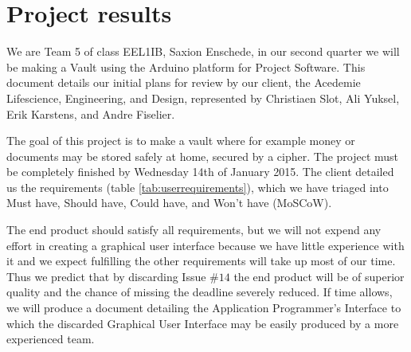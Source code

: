 \chapter{Project results}
We are Team 5 of class EEL1IB, Saxion Enschede, in our second quarter we will be making a Vault using the Arduino platform for Project Software. This document details our initial plans for review by our client, the Acedemie Lifescience, Engineering, and Design, represented by Christiaen Slot, Ali Yuksel, Erik Karstens, and Andre Fiselier.

The goal of this project is to make a vault where for example money or documents may be stored safely at home, secured by a cipher. The project must be completely finished by Wednesday 14th of January 2015. The client detailed us the requirements (table \ref{tab:userrequirements}), which we have triaged into Must have, Should have, Could have, and Won't have (MoSCoW).

The end product should satisfy all requirements, but we will not expend any effort in creating a graphical user interface because we have little experience with it and we expect fulfilling the other requirements will take up most of our time. Thus we predict that by discarding Issue $\#14$ the end product will be of superior quality and the chance of missing the deadline severely reduced. If time allows, we will produce a document detailing the Application Programmer's Interface to which the discarded Graphical User Interface may be easily produced by a more experienced team.

